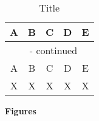 \documentclass[11pt,a4paper]{article}
\begin{document}
\newpage 

\begin{spacing}{1}
\begin{longtable}{|c|c|c|c|c|}
    \caption{Title}
    \label{tab-label-name} \\
    \hline
    \multicolumn{1}{|c|}{A}&
    \multicolumn{1}{c|}{B}&
    \multicolumn{1}{c|}{C}&
    \multicolumn{1}{c|}{D}&
    \multicolumn{1}{c|}{E}\\
    \hline
    \endfirsthead
    \multicolumn{5}{c}{{\tablename\ \thetable{} - continued}} \\
    \hline
    \multicolumn{1}{|c|}{A}&
    \multicolumn{1}{c|}{B}&
    \multicolumn{1}{c|}{C}&
    \multicolumn{1}{c|}{D}&
    \multicolumn{1}{c|}{E}\\
    \hline
    \endhead
    \hline
    \endfoot
    \hline
    \endlastfoot
    X&X&X&X&X\\
    \hline
\end{longtable}
\end{spacing}

\newpage

\noindent\textbf{\Large{Figures}}

\end{document}
